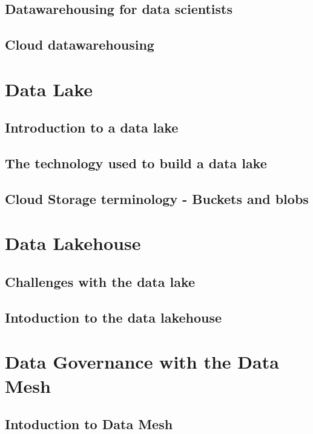 \documentclass[11pt]{article}
\begin{document}
    \subsection{Datawarehousing for data scientists}
    
    \subsection{Cloud datawarehousing}

    \section{Data Lake}

    \subsection{Introduction to a data lake}
    
    \subsection{The technology used to build a data lake}
    
    \subsection{Cloud Storage terminology - Buckets and blobs}
    
    \section{Data Lakehouse}
    
    \subsection{Challenges with the data lake}
    
    \subsection{Intoduction to the data lakehouse}

    \section{Data Governance with the Data Mesh}
    
    \subsection{Intoduction to Data Mesh}
\end{document}
